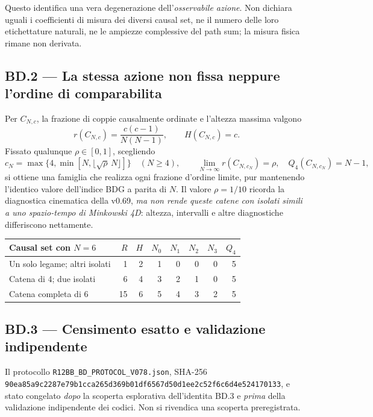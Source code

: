 \documentclass[11pt,a4paper]{article}
\begin{document}
Questo identifica una vera degenerazione dell'\emph{osservabile azione}. Non dichiara uguali i coefficienti di misura dei diversi causal set, ne il numero delle loro etichettature naturali, ne le ampiezze complessive del path sum; la misura fisica rimane non derivata.

\subsection*{BD.2 --- La stessa azione non fissa neppure l'ordine di comparabilita}
Per $C_{N,c}$, la frazione di coppie causalmente ordinate e l'altezza massima valgono
\begin{equation}
 r(C_{N,c})=\frac{c(c-1)}{N(N-1)},\qquad H(C_{N,c})=c.
 \tag{BD.4}
\end{equation}
Fissato qualunque $\rho\in[0,1]$, scegliendo
\begin{equation}
 c_N=\max\{4,\min[N,\lfloor\sqrt\rho\,N\rfloor]\}
 \quad(N\ge4),\qquad
 \lim_{N\to\infty}r(C_{N,c_N})=\rho,\quad Q_4(C_{N,c_N})=N-1,
 \tag{BD.5}
\end{equation}
si ottiene una famiglia che realizza ogni frazione d'ordine limite, pur mantenendo l'identico valore dell'indice BDG a parita di $N$. Il valore $\rho=1/10$ ricorda la diagnostica cinematica della v0.69, \emph{ma non rende queste catene con isolati simili a uno spazio-tempo di Minkowski 4D}: altezza, intervalli e altre diagnostiche differiscono nettamente.

\begin{center}\small
\begin{tabular}{lrrrrrrr}
\toprule
Causal set con $N=6$ & $R$ & $H$ & $N_0$ & $N_1$ & $N_2$ & $N_3$ & $Q_4$\\
\midrule
Un solo legame; altri isolati & 1 & 2 & 1 & 0 & 0 & 0 & 5\\
Catena di 4; due isolati & 6 & 4 & 3 & 2 & 1 & 0 & 5\\
Catena completa di 6 & 15 & 6 & 5 & 4 & 3 & 2 & 5\\
\bottomrule
\end{tabular}
\end{center}

\subsection*{BD.3 --- Censimento esatto e validazione indipendente}
Il protocollo \texttt{R12BB\_BD\_PROTOCOL\_V078.json}, SHA-256 \texttt{90ea85a9c2287e79b1cca265d369b01d}\linebreak\texttt{f6567d50d1ee2c52f6c6d4e524170133}, e stato congelato \emph{dopo} la scoperta esplorativa dell'identita BD.3 e \emph{prima} della validazione indipendente dei codici. Non si rivendica una scoperta preregistrata.
\end{document}
